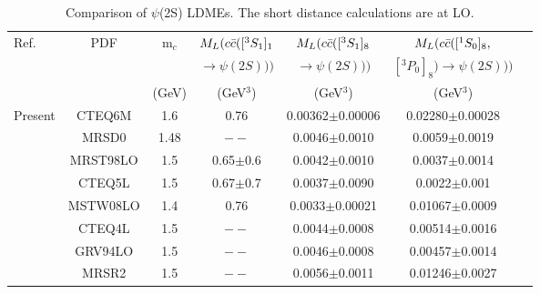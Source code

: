 \documentclass[aps,prc,preprint,superscriptaddress,showpacs,showkeys,amsmath]{revtex4-1}
\begin{document}
\begin{table}[h]
\caption{Comparison of $\psi$(2S) LDMEs. The short distance calculations are at LO. }
\begin{tabular}{|l|c|c|c|c|c|c|}
\hline            
Ref.       &PDF     &m$_{c}$  &$M_{L}(c{\bar{c}}([^3S_1]_{1}$      &$M_{L}(c{\bar{c}}([^3S_1]_{8}$    &$M_{L}(c{\bar{c}}([^1S_0]_{8},$ \\
           &        &        &$\rightarrow \psi(2S)))$      &$\rightarrow \psi(2S)))$    &$[^3P_0]_{8})\rightarrow \psi(2S)))$   \\
           &        &(GeV)   &(GeV$^{3}$)                    &(GeV$^3$)                   &(GeV$^3$)                            \\ 
\hline
 Present                           &CTEQ6M   &1.6     &0.76           &0.00362$\pm$0.00006 &0.02280$\pm$0.00028                                \\
\cite{Cho:1995vh}               &MRSD0    &1.48    &$--$           &0.0046$\pm$0.0010   &0.0059$\pm$0.0019                                 \\
\cite{Braaten:1999qk}           &MRST98LO &1.5     &0.65$\pm$0.6   &0.0042$\pm$0.0010   &0.0037$\pm$0.0014                                 \\
\cite{Braaten:1999qk}           &CTEQ5L   &1.5     &0.67$\pm$0.7   &0.0037$\pm$0.0090   &0.0022$\pm$0.001                                  \\
\cite{Sharma:2012dy}            &MSTW08LO &1.4     &0.76           &0.0033$\pm$0.00021  &0.01067$\pm$0.0009                               \\
\cite{Beneke:1996yw}            &CTEQ4L   &1.5     &$--$           &0.0044$\pm$0.0008   &0.00514$\pm$0.0016                               \\
\cite{Beneke:1996yw}            &GRV94LO  &1.5     &$--$           &0.0046$\pm$0.0008   &0.00457$\pm$0.0014                                \\
\cite{Beneke:1996yw}            &MRSR2    &1.5     &$--$           &0.0056$\pm$0.0011   &0.01246$\pm$0.0027                                \\
\hline
\end{tabular}
\label{table:LDMEPsi2S}
\end{table}
\end{document}
